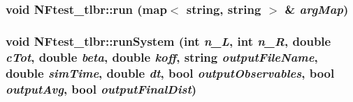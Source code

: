 \subsubsection{\setlength{\rightskip}{0pt plus 5cm}void NFtest\_\-tlbr::run (map$<$ string, string $>$ \& {\em argMap})}\label{namespaceNFtest__tlbr_02fe303e15540fbfb6dd165e8a4e0c4d}


\subsubsection{\setlength{\rightskip}{0pt plus 5cm}void NFtest\_\-tlbr::runSystem (int {\em n\_\-L}, int {\em n\_\-R}, double {\em cTot}, double {\em beta}, double {\em koff}, string {\em outputFileName}, double {\em simTime}, double {\em dt}, bool {\em outputObservables}, bool {\em outputAvg}, bool {\em outputFinalDist})}\label{namespaceNFtest__tlbr_492622afdde6500cd6ce214b3282117a}


